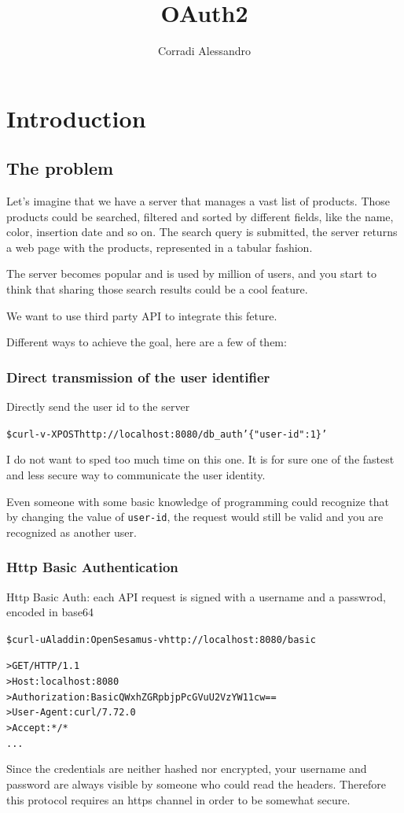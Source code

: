 \documentclass{style}
\title{OAuth2}
\author{Corradi Alessandro}
\begin{document}
\maketitle{}
\tableofcontents
\clearpage
{}


\section{Introduction}
\subsection{The problem}
Let's imagine that we have a server that manages a vast list of products. Those
products could be searched, filtered and sorted by different fields, like the
name, color, insertion date and so on.  The search query is submitted, the
server returns a web page with the products, represented in a tabular fashion.

The server becomes popular and is used by million of users, and you start to
think that sharing those search results could be a cool feature.

We want to use third party API to integrate this feture.

Different ways to achieve the goal, here are a few of them:
\subsubsection{Direct transmission of the user identifier}
Directly send the user id to the server
\begin{alltt}
    \$ curl -v -X POST http://localhost:8080/db_auth '\{"user-id": 1\}'
\end{alltt}
I do not want to sped too much time on this one. It is for sure one of the
fastest
and less secure way to communicate the user identity.

Even someone with some basic knowledge of programming could recognize that by changing the
value of \texttt{user-id}, the request would still be valid and you are recognized as
another user.

\subsubsection{Http Basic Authentication}
Http Basic Auth: each API request is signed with a username and a passwrod, encoded in base64
\begin{alltt}
    \$ curl -u Aladdin:OpenSesamus -v http://localhost:8080/basic

    > GET / HTTP/1.1
    > Host: localhost:8080
    > Authorization: Basic QWxhZGRpbjpPcGVuU2VzYW11cw==
    > User-Agent: curl/7.72.0
    > Accept: */*
    ...
\end{alltt}
Since the credentials are neither hashed nor encrypted, your username and password are always visible by
someone who could read the headers.
Therefore this protocol requires an https channel in order to be somewhat secure.
\end{document}
